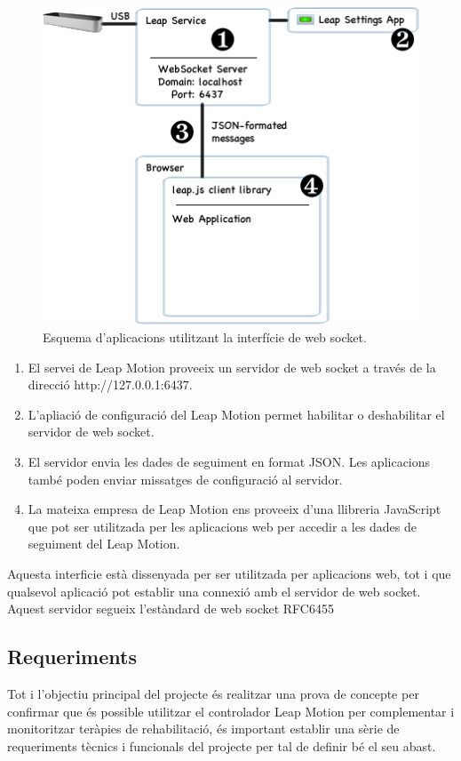 \documentclass[12pt,a4paper,catalan]{article}
\begin{document}
	\begin{figure}[H]
		\includegraphics[width=\textwidth,keepaspectratio]{websocket-interface.png}
		\centering
		\caption{Esquema d'aplicacions utilitzant la interfície de web socket.}
	\end{figure}
	
	\begin{enumerate}
		\item El servei de Leap Motion proveeix un servidor de web socket a través de la direcció http://127.0.0.1:6437.
		\item L’apliació de configuració del Leap Motion permet habilitar o deshabilitar el servidor de web socket.
		\item El servidor envia les dades de seguiment en format JSON. Les aplicacions també poden enviar missatges de configuració al servidor.
		\item La mateixa empresa de Leap Motion ens proveeix d’una llibreria JavaScript que pot ser utilitzada per les aplicacions web per accedir a les dades de seguiment del Leap Motion.
	\end{enumerate}
	
	Aquesta interficie està dissenyada per ser utilitzada per aplicacions web, tot i que qualsevol aplicació pot establir una connexió amb el servidor de web socket. Aquest servidor segueix l’estàndard de web socket RFC6455

	\subsection{Requeriments}
	Tot i l'objectiu principal del projecte és realitzar una prova de concepte per confirmar que és possible utilitzar el controlador Leap Motion per complementar i monitoritzar teràpies de rehabilitació, és important establir una sèrie de requeriments tècnics i funcionals del projecte per tal de definir bé el seu abast.
\end{document}
